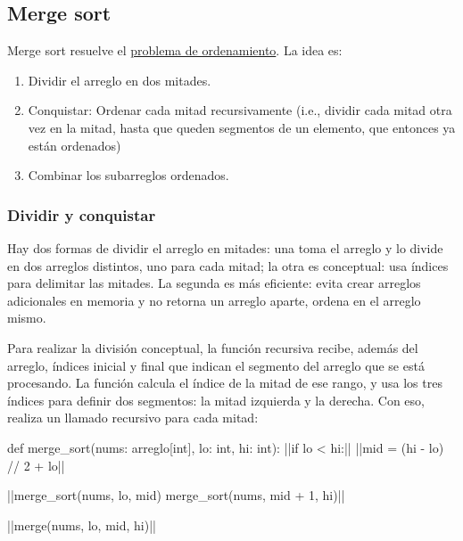 \subsection{Merge sort}
\label{sec:merge_sort}

Merge sort resuelve el \hyperref[sec:problema]{problema de ordenamiento}. La idea es:
\begin{enumerate}
    \item Dividir el arreglo en dos mitades.
    \item Conquistar: Ordenar cada mitad recursivamente (i.e., dividir cada mitad otra vez en la mitad, hasta que queden segmentos de un elemento, que entonces ya están ordenados)
    \item Combinar los subarreglos ordenados.
\end{enumerate}

\subsubsection{Dividir y conquistar}

Hay dos formas de dividir el arreglo en mitades: una toma el arreglo y lo divide en dos arreglos distintos, uno para cada mitad; la otra es conceptual: usa índices para delimitar las mitades. La segunda es más eficiente: evita crear arreglos adicionales en memoria y no retorna un arreglo aparte, ordena en el arreglo mismo.

Para realizar la división conceptual, la función recursiva recibe, además del arreglo, índices inicial y final que indican el segmento del arreglo que se está procesando. La función calcula el índice de la mitad de ese rango, y usa los tres índices para definir dos segmentos: la mitad izquierda y la derecha. Con eso, realiza un llamado recursivo para cada mitad:

\begin{codeblock}
\begin{pseudocode}
def merge_sort(nums: arreglo[int], lo: int, hi: int):
    ||if lo < hi:||
        ||mid = (hi - lo) // 2 + lo||

        ||merge_sort(nums, lo, mid)
        merge_sort(nums, mid + 1, hi)||

        ||merge(nums, lo, mid, hi)||
\end{pseudocode}
\begin{annotations}
\end{annotations}
\end{codeblock}

